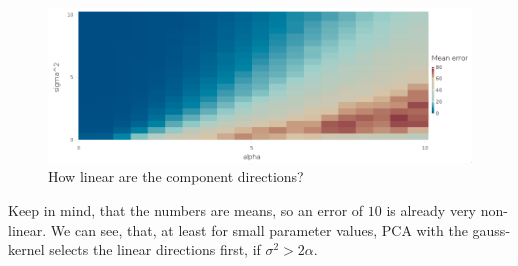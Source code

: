 \documentclass[10pt,a4paper]{article}
\begin{document}
\begin{figure}[h]
  \centering
  \includegraphics[width=350pt]{7_2_c_graph}
  \caption{How linear are the component directions?}
\end{figure}
Keep in mind, that the numbers are means, so an error of $10$ is already very
non-linear. We can see, that, at least for small parameter values, PCA with the
gauss-kernel selects the linear directions first, if $\sigma^{2} > 2\alpha$.
\end{document}
